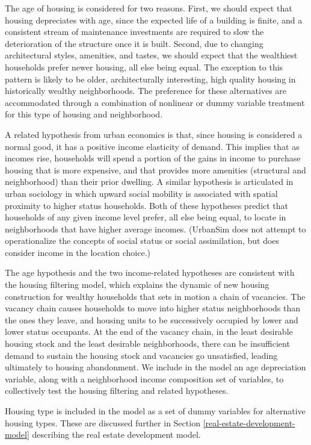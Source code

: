 The age of housing is considered for two reasons.  First, we
should expect that housing depreciates with age, since the
expected life of a building is finite, and a consistent stream of
maintenance investments are required to slow the deterioration of
the structure once it is built.  Second, due to changing
architectural styles, amenities, and tastes, we should expect that
the wealthiest households prefer newer housing, all else being
equal.  The exception to this pattern is likely to be older,
architecturally interesting, high quality housing in historically
wealthy neighborhoods.  The preference for these alternatives are
accommodated through a combination of nonlinear or dummy variable
treatment for this type of housing and neighborhood.

A related hypothesis from urban economics is that, since housing
is considered a normal good, it has a positive income elasticity
of demand.  This implies that as incomes rise, households will
spend a portion of the gains in income to purchase housing that is
more expensive, and that provides more amenities (structural and
neighborhood) than their prior dwelling.  A similar hypothesis is
articulated in urban sociology in which upward social mobility is
associated with spatial proximity to higher status households.
Both of these hypotheses predict that households of any given
income level prefer, all else being equal, to locate in
neighborhoods that have higher average incomes.  (UrbanSim does
not attempt to operationalize the concepts of social status or
social assimilation, but does consider income in the location
choice.)

The age hypothesis and the two income-related hypotheses are
consistent with the housing filtering model, which explains the
dynamic of new housing construction for wealthy households that
sets in motion a chain of vacancies.   The vacancy chain causes
households to move into higher status neighborhoods than the ones
they leave, and housing units to be successively occupied by lower
and lower status occupants.  At the end of the vacancy chain, in
the least desirable housing stock and the least desirable
neighborhoods, there can be insufficient demand to sustain the
housing stock and vacancies go unsatisfied, leading ultimately to
housing abandonment.  We include in the model an age depreciation
variable, along with a neighborhood income composition set of
variables, to collectively test the housing filtering and related
hypotheses.

Housing type is included in the model as a set of dummy variables
for alternative housing types.  These
are discussed further in Section
\ref{real-estate-development-model} describing the real estate
development model.

